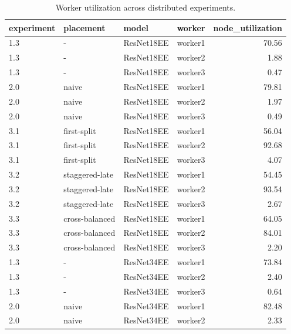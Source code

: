 \begin{table}
\centering
\caption{Worker utilization across distributed experiments.}
\label{tab:distributed-node-utilization}
\begin{tabular}{llllr}
\toprule
experiment &      placement &      model &  worker &  node\_utilization \\
\midrule
       1.3 &              - & ResNet18EE & worker1 &             70.56 \\
       1.3 &              - & ResNet18EE & worker2 &              1.88 \\
       1.3 &              - & ResNet18EE & worker3 &              0.47 \\
       2.0 &          naive & ResNet18EE & worker1 &             79.81 \\
       2.0 &          naive & ResNet18EE & worker2 &              1.97 \\
       2.0 &          naive & ResNet18EE & worker3 &              0.49 \\
       3.1 &    first-split & ResNet18EE & worker1 &             56.04 \\
       3.1 &    first-split & ResNet18EE & worker2 &             92.68 \\
       3.1 &    first-split & ResNet18EE & worker3 &              4.07 \\
       3.2 & staggered-late & ResNet18EE & worker1 &             54.45 \\
       3.2 & staggered-late & ResNet18EE & worker2 &             93.54 \\
       3.2 & staggered-late & ResNet18EE & worker3 &              2.67 \\
       3.3 & cross-balanced & ResNet18EE & worker1 &             64.05 \\
       3.3 & cross-balanced & ResNet18EE & worker2 &             84.01 \\
       3.3 & cross-balanced & ResNet18EE & worker3 &              2.20 \\
       1.3 &              - & ResNet34EE & worker1 &             73.84 \\
       1.3 &              - & ResNet34EE & worker2 &              2.40 \\
       1.3 &              - & ResNet34EE & worker3 &              0.64 \\
       2.0 &          naive & ResNet34EE & worker1 &             82.48 \\
       2.0 &          naive & ResNet34EE & worker2 &              2.33 \\

\end{tabular}
\end{table}
